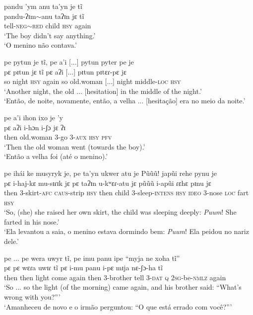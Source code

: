 \documentclass[output=paper,
modfonts,nonflat
]{langsci/langscibook}
\begin{document}
\ea pandu 'ym anu ta'yn je tĩ  \\[.3em]
\gll pandu-ʔɪm$\sim$anu taʔɪn jɛ tĩ \\
tell-\textsc{neg$\sim$red} child \textsc{hsy} again \\
\glt ‘The boy didn’t say anything.’ \\
‘O menino não contava.’ \\
\z

\ea pe pytun je tĩ, pe a'i [...] pytun pyter pe je \\[.3em]
\gll pɛ pɪtun jɛ tĩ pɛ aʔi [...] pɪtun pɪtɛɾ-pɛ jɛ \\
so night \textsc{hsy} again so old.woman [...] night middle-\textsc{loc} \textsc{hsy} \\
\glt ‘Another night, the old ... [hesitation] in the middle of the night.’ \\
‘Então, de noite, novamente, então, a velha ... [hesitação] era no meio da noite.’ \\
\z

 
\ea pe a'i ihon ixo je 'y \\[.3em]
\gll pɛ aʔi i-hɔn i-ʃɔ jɛ ʔɪ \\
then old.woman 3-go \textsc{3-aux} \textsc{hsy} \textsc{pfv} \\
\glt ‘Then the old woman went (towards the boy).’ \\
‘Então a velha foi (até o menino).’ \\
\z

\ea pe ihái ke musyryk je, pe ta'yn ukwer atu je Pũũũ! japũi rehe pynu je \\[.3em]
\gll pɛ i-haj-kɛ mu-sɪɾɪk jɛ pɛ taʔɪn u-kʷɛɾ-atu jɛ pũũũ i-apũi ɾɛhɛ pɪnu jɛ \\
then 3-skirt\textsc{-afc} \textsc{caus-}strip \textsc{hsy} then child 3-sleep-\textsc{intens} \textsc{hsy} \textsc{ideo} 3-nose \textsc{loc} fart \textsc{hsy} \\
\glt ‘So, (she) she raised her own skirt, the child was sleeping deeply: \textit{Puum}! She farted in his nose.’ \\
‘Ela levantou a saia, o menino estava dormindo bem: \textit{Puum}! Ela peidou no nariz dele.’ \\
\z

\ea pe ... pe wera uwyr tĩ, pe imu panu ipe “myja ne xoha tĩ” \\[.3em]
\gll pɛ pɛ wɛɾa uwɪɾ tĩ pɛ i-mu panu i-pɛ mɪja nɛ-ʃɔ-ha tĩ \\
then then light come again then 3-brother tell 3-\textsc{dat} \textsc{q} \textsc{2sg}-be\textsc{-nmlz} again \\
\glt ‘So ... so the light (of the morning) came again, and his brother said: “What’s wrong with you?”’ \\
‘Amanheceu de novo e o irmão perguntou: “O que está errado com você?”’ \\
\z
\end{document}
